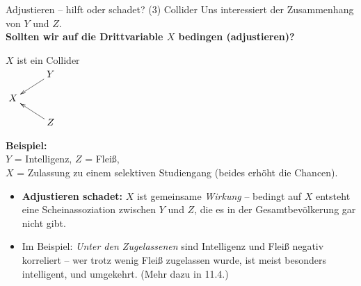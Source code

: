\documentclass[
  10pt,
  ignorenonframetext,
]{beamer}
\providecommand{\tightlist}{%
  \setlength{\itemsep}{0pt}\setlength{\parskip}{0pt}}
\begin{document}
\begin{frame}{Adjustieren -- hilft oder schadet? (3) Collider}
\protect\hypertarget{adjustieren-hilft-oder-schadet-3-collider}{}
Uns interessiert der Zusammenhang von \(Y\) und \(Z\).\\
\textbf{Sollten wir auf die Drittvariable \(X\) bedingen (adjustieren)?}

\columnsbegin
\column{3.7cm}
\begin{center}
$X$ ist ein Collider\\[.3em]
$\xymatrix@R-1pc{
 & Y \ar[dl] \\ X & \\ & Z \ar[ul]
}$
\end{center}
\column{7cm}
\small

\textbf{Beispiel:}\\
\(Y\) = Intelligenz, \(Z\) = Fleiß,\\
\(X\) = Zulassung zu einem selektiven Studiengang (beides erhöht die
Chancen). \columnsend

\begin{itemize}[<+->]
\tightlist
\item
  \textbf{Adjustieren schadet:} \(X\) ist gemeinsame \emph{Wirkung} --
  bedingt auf \(X\) entsteht eine Scheinassoziation zwischen \(Y\) und
  \(Z\), die es in der Gesamtbevölkerung gar nicht gibt.
\item
  Im Beispiel: \emph{Unter den Zugelassenen} sind Intelligenz und Fleiß
  negativ korreliert -- wer trotz wenig Fleiß zugelassen wurde, ist
  meist besonders intelligent, und umgekehrt. (Mehr dazu in 11.4.)
\end{itemize}
\end{frame}
\end{document}
